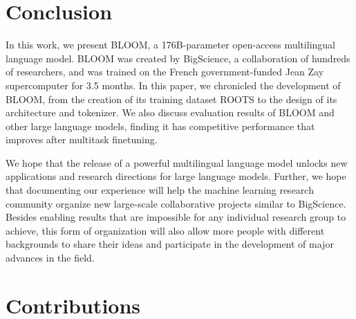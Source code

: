 \documentclass[twoside,11pt]{article}
\begin{document}





\section{Conclusion}
In this work, we present BLOOM, a 176B-parameter open-access multilingual language model.
BLOOM was created by BigScience, a collaboration of hundreds of researchers, and was trained on the French government-funded Jean Zay supercomputer for 3.5 months.
In this paper, we chronicled the development of BLOOM, from the creation of its training dataset ROOTS to the design of its architecture and tokenizer.
We also discuss evaluation results of BLOOM and other large language models, finding it has competitive performance that improves after multitask finetuning.

We hope that the release of a powerful multilingual language model unlocks new applications and research directions for large language models.
Further, we hope that documenting our experience will help the machine learning research community organize new large-scale collaborative projects similar to BigScience. Besides enabling results that are impossible for any individual research group to achieve, this form of organization will also allow more people with different backgrounds to share their ideas and participate in the development of major advances in the field.

\section{Contributions}
\label{sec:contributions}
\end{document}
